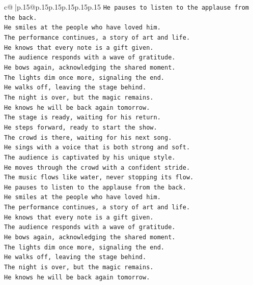 \documentclass{article}
\begin{document}
{\begin{supertabular}{c@{$\;$}|p{.15\linewidth}@{}p{.15\linewidth}p{.15\linewidth}p{.15\linewidth}p{.15\linewidth}p{.15\linewidth}}
{{{\texttt{He pauses to listen to the applause from the back.} \\
\texttt{He smiles at the people who have loved him.} \\
\texttt{The performance continues, a story of art and life.} \\
\texttt{He knows that every note is a gift given.} \\
\texttt{The audience responds with a wave of gratitude.} \\
\texttt{He bows again, acknowledging the shared moment.} \\
\texttt{The lights dim once more, signaling the end.} \\
\texttt{He walks off, leaving the stage behind.} \\
\texttt{The night is over, but the magic remains.} \\
\texttt{He knows he will be back again tomorrow.} \\
\texttt{The stage is ready, waiting for his return.} \\
\texttt{He steps forward, ready to start the show.} \\
\texttt{The crowd is there, waiting for his next song.} \\
\texttt{He sings with a voice that is both strong and soft.} \\
\texttt{The audience is captivated by his unique style.} \\
\texttt{He moves through the crowd with a confident stride.} \\
\texttt{The music flows like water, never stopping its flow.} \\
\texttt{He pauses to listen to the applause from the back.} \\
\texttt{He smiles at the people who have loved him.} \\
\texttt{The performance continues, a story of art and life.} \\
\texttt{He knows that every note is a gift given.} \\
\texttt{The audience responds with a wave of gratitude.} \\
\texttt{He bows again, acknowledging the shared moment.} \\
\texttt{The lights dim once more, signaling the end.} \\
\texttt{He walks off, leaving the stage behind.} \\
\texttt{The night is over, but the magic remains.} \\
\texttt{He knows he will be back again tomorrow.} \\
}}}
\end{supertabular}}
\end{document}
